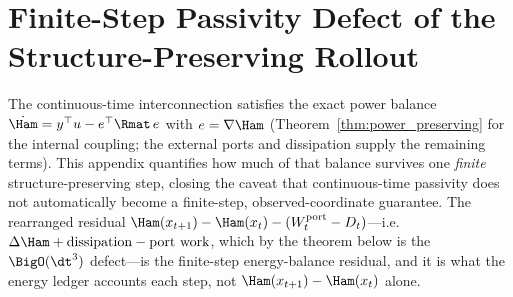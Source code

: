 \section{Finite-Step Passivity Defect of the Structure-Preserving Rollout}
\label{app:passivity-defect}

The continuous-time interconnection satisfies the exact power balance $\dot{\Ham}=y^\top u-e^\top\Rmat\,e$ with $e=\nabla\Ham$ (Theorem~\ref{thm:power_preserving} for the internal coupling; the external ports and dissipation supply the remaining terms).
This appendix quantifies how much of that balance survives one \emph{finite} structure-preserving step, closing the caveat that continuous-time passivity does not automatically become a finite-step, observed-coordinate guarantee.
The rearranged residual $\Ham(x_{t+1})-\Ham(x_t)-(W^{\mathrm{port}}_t-D_t)$---i.e.\ $\Delta\Ham+\text{dissipation}-\text{port work}$, which by the theorem below is the $\BigO(\dt^3)$ defect---is the finite-step energy-balance residual, and it is what the energy ledger accounts each step, not $\Ham(x_{t+1})-\Ham(x_t)$ alone.

